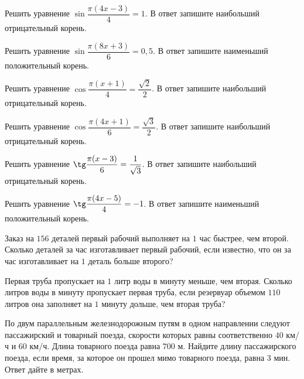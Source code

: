 \begin{homework}[number=2]
	\begin{listofex}
		\item Решить уравнение \( \sin\dfrac{\pi(4x-3)}{4}=1 \). В ответ запишите наибольший отрицательный корень.
		\item Решить уравнение \( \sin\dfrac{\pi(8x+3)}{6}=0,5 \). В ответ запишите наименьший положительный корень.
		\item Решить уравнение \( \cos\dfrac{\pi(x+1)}{4}=\dfrac{\sqrt{2}}{2} \). В ответ запишите наибольший отрицательный корень.
		\item Решить уравнение \( \cos\dfrac{\pi(4x+1)}{6}=\dfrac{\sqrt{3}}{2} \). В ответ запишите наибольший отрицательный корень.
		\item Решить уравнение \( \tg\dfrac{\pi(x-3)}{6}=\dfrac{1}{\sqrt{3}} \). В ответ запишите наибольший отрицательный корень.
		\item Решить уравнение \( \tg\dfrac{\pi(4x-5)}{4}=-1 \). В ответ запишите наименьший положительный корень.
		\item Заказ на \(156\) деталей первый рабочий выполняет на \(1\) час быстрее, чем второй. Сколько деталей за час изготавливает первый рабочий, если известно, что он за час изготавливает на \(1\) деталь больше второго?
		\item Первая труба пропускает на \(1\) литр воды в минуту меньше, чем вторая. Сколько литров воды в минуту пропускает первая труба, если резервуар объемом \(110\) литров она заполняет на \(1\) минуту дольше, чем вторая труба?
		\item По двум параллельным железнодорожным путям в одном направлении следуют пассажирский и товарный поезда, скорости которых равны соответственно \(40\) км/ч и \(60\) км/ч. Длина товарного поезда равна \(700\) м. Найдите длину пассажирского поезда, если время, за которое он прошел мимо товарного поезда, равна \(3\) мин. Ответ дайте в метрах.
	\end{listofex}
\end{homework}

